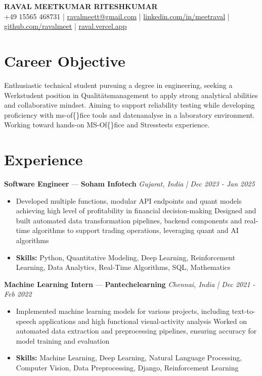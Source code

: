 \documentclass[a4paper,10pt]{article}
\begin{document}
\begin{center}
  {\Large\bfseries RAVAL MEETKUMAR RITESHKUMAR}\\[2pt]
  {\small +49 15565 468731 \;|\; \href{mailto:ravalmeett@gmail.com}{ravalmeett@gmail.com} \;|\; \href{https://www.linkedin.com/in/meetraval/}{linkedin.com/in/meetraval} \;|\; \href{https://github.com/ravalmeet}{github.com/ravalmeet} \;|\; \href{https://raval.vercel.app/}{raval.vercel.app}}
\end{center}
\vspace{-3pt}

\section*{Career Objective}
Enthusiastic technical student pursuing a degree in engineering, seeking a Werkstudent position in Qualitätsmanagement to apply strong analytical abilities and collaborative mindset. Aiming to support reliability testing while developing proficiency with ms-of\{\}fice tools and datenanalyse in a laboratory environment. Working toward hands-on MS-Of\{\}fice and Stresstests experience.\par

\section*{Experience}
\textbf{Software Engineer} — \textbf{Soham Infotech} \hfill \textit{Gujarat, India \;|\; Dec 2023 - Jan 2025}\par
\vspace{1pt}
\begin{itemize}
  \item Developed multiple functions, modular API endpoints and quant models achieving high level of profitability in financial decision-making Designed and built automated data transformation pipelines, backend components and real-time algorithms to support trading operations, leveraging quant and AI algorithms
  \item \textbf{Skills:} Python, Quantitative Modeling, Deep Learning, Reinforcement Learning, Data Analytics, Real-Time Algorithms, SQL, Mathematics
\end{itemize}
\vspace{3pt}
\textbf{Machine Learning Intern} — \textbf{Pantechelearning} \hfill \textit{Chennai, India \;|\; Dec 2021 - Feb 2022}\par
\vspace{1pt}
\begin{itemize}
  \item Implemented machine learning models for various projects, including text-to-speech applications and high functional visual-activity analysis Worked on automated data extraction and preprocessing pipelines, ensuring accuracy for model training and evaluation
  \item \textbf{Skills:} Machine Learning, Deep Learning, Natural Language Processing, Computer Vision, Data Preprocessing, Django, Reinforcement Learning
\end{itemize}
\end{document}
